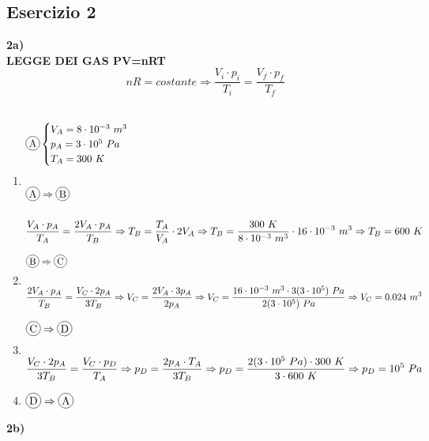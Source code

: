\documentclass{article}
\newcommand*\circled[1]{\tikz[baseline=(char.base)]{
            \node[shape=circle,draw,inner sep=1.2pt] (char) {#1};}
}
\begin{document}
\pagebreak

\subsection*{Esercizio 2}
\textbf{2a)} \\

\hspace*{0.85cm}\textbf{LEGGE DEI GAS PV=nRT} \\
\begin{equation*}
   nR = costante \Rightarrow \frac{V_i \cdot p_i}{T_i} = \frac{V_f \cdot p_f}{T_f} 
\end{equation*} \\

\begin{enumerate}[label=\textbf{.\roman*)}]
    \item \begin{align*}
        &\circled{A} \begin{cases}
            V_A = 8 \cdot 10^{-3}\ m^3 \\
            p_A = 3\cdot 10^5\ Pa \\
            T_A = 300\ K
        \end{cases} \\ \\
        &\circled{A} \Rightarrow \circled{B} \\ \\
            &\frac{V_A \cdot p_A}{T_A} = \frac{2V_A \cdot p_A}{T_B}
            \Rightarrow T_B = \frac{T_A}{V_A} \cdot 2V_A
            \Rightarrow T_B = \frac{300\ K}{8\cdot10^{-3}\ m^3} \cdot 16\cdot10^{-3}\ m^3
            \Rightarrow T_B = 600\ K
    \end{align*}
    \item \begin{align*}
        &\circled{B} \Rightarrow \circled{C} \\ \\
        &\frac{2V_A \cdot p_A}{T_B} = \frac{V_C\cdot2p_A}{3T_B}
        \Rightarrow V_C = \frac{2V_A \cdot 3p_A}{2p_A}
        \Rightarrow V_C = \frac{16\cdot10^{-3}\ m^3 \cdot 3(3\cdot10^5)\ Pa}{2(3\cdot10^5)\ Pa}
        \Rightarrow V_C = 0.024\ m^3
    \end{align*}
    \item \begin{align*}
        &\circled{C} \Rightarrow \circled{D} \\ \\
        &\frac{V_C \cdot 2p_A}{3T_B} = \frac{V_C \cdot p_D}{T_A}
        \Rightarrow p_D = \frac{2p_A \cdot T_A}{3T_B}
        \Rightarrow p_D = \frac{2(3\cdot10^5\ Pa) \cdot 300\ K}{3\cdot 600\ K}
        \Rightarrow p_D = 10^5\ Pa
    \end{align*}
    \item \hspace{0.85cm}$\circled{D} \Rightarrow \circled{A}$
\end{enumerate}
\pagebreak
\textbf{2b)} \\
\end{document}

